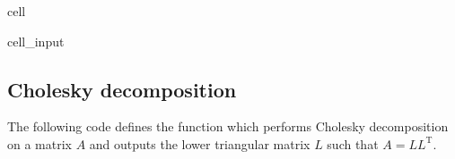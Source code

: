 \documentclass[letterpaper,10pt,english]{jupyterBook}
\begin{document}
\begin{sphinxuseclass}{cell}\begin{sphinxVerbatimInput}

\begin{sphinxuseclass}{cell_input}
\begin{sphinxVerbatim}[commandchars=\\\{\}]
 
      \PYG{p}{[}\PYG{p}{]}
      
       
           \PYG{p}{[}\PYG{p}{]} 
              
             \PYG{p}{[}\PYG{p}{]}  
                   \PYG{p}{[}\PYG{p}{]} 
                
        \PYG{p}{[}\PYG{p}{[} \PYG{p}{]}\PYG{p}{]}  \PYG{p}{[}\PYG{p}{[} \PYG{p}{]}\PYG{p}{]}
        \PYG{p}{[}\PYG{p}{[} \PYG{p}{]}\PYG{p}{]}  \PYG{p}{[}\PYG{p}{[} \PYG{p}{]}\PYG{p}{]}
        
      
\end{sphinxVerbatim}

\end{sphinxuseclass}\end{sphinxVerbatimInput}

\end{sphinxuseclass}

\subsection{Cholesky decomposition}
\label{\detokenize{8_Appendices/8.1_Python:cholesky-decomposition}}
\sphinxAtStartPar
The following code defines the function  which performs Cholesky decomposition on a matrix \(A\) and outputs the lower triangular matrix \(L\) such that \(A = LL^\mathrm{T}\).
\end{document}
